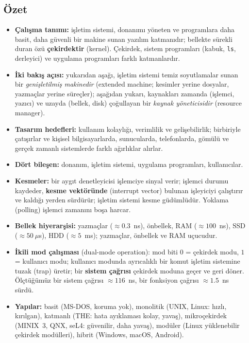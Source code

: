 \documentclass[11pt,a4paper]{article}
\newcommand{\term}[1]{\textbf{\color{mintdeep}#1}}
\newcommand{\cmd}[1]{\texttt{#1}}
\begin{document}
\subsection*{Özet}
\begin{itemize}
  \item \textbf{Çalışma tanımı:} işletim sistemi, donanımı yöneten ve programlara daha basit, daha güvenli bir makine sunan yazılım katmanıdır; bellekte sürekli duran özü \term{çekirdektir} (kernel). Çekirdek, sistem programları (kabuk, \cmd{ls}, derleyici) ve uygulama programları farklı katmanlardır.
  \item \textbf{İki bakış açısı:} yukarıdan aşağı, işletim sistemi temiz soyutlamalar sunan bir \emph{genişletilmiş makinedir} (extended machine; kesimler yerine dosyalar, yazmaçlar yerine süreçler); aşağıdan yukarı, kaynakları zamanda (işlemci, yazıcı) ve uzayda (bellek, disk) çoğullayan bir \emph{kaynak yöneticisidir} (resource manager).
  \item \textbf{Tasarım hedefleri:} kullanım kolaylığı, verimlilik ve gelişebilirlik; birbiriyle çatışırlar ve kişisel bilgisayarlarda, sunucularda, telefonlarda, gömülü ve gerçek zamanlı sistemlerde farklı ağırlıklar alırlar.
  \item \textbf{Dört bileşen:} donanım, işletim sistemi, uygulama programları, kullanıcılar.
  \item \textbf{Kesmeler:} bir aygıt denetleyicisi işlemciye sinyal verir; işlemci durumu kaydeder, \term{kesme vektöründe} (interrupt vector) bulunan işleyiciyi çalıştırır ve kaldığı yerden sürdürür; işletim sistemi kesme güdümlüdür. Yoklama (polling) işlemci zamanını boşa harcar.
  \item \textbf{Bellek hiyerarşisi:} yazmaçlar ($\approx 0.3$~ns), önbellek, RAM ($\approx 100$~ns), SSD ($\approx 50\ \mu$s), HDD ($\approx 5$~ms); yazmaçlar, önbellek ve RAM uçucudur.
  \item \textbf{İkili mod çalışması} (dual-mode operation): mod biti $0$ = çekirdek modu, $1$ = kullanıcı modu; kullanıcı modunda ayrıcalıklı bir komut işletim sistemine tuzak (trap) üretir; bir \term{sistem çağrısı} çekirdek moduna geçer ve geri döner. Ölçtüğümüz bir sistem çağrısı $\approx 116$~ns, bir fonksiyon çağrısı $\approx 1.5$~ns sürdü.
  \item \textbf{Yapılar:} basit (MS-DOS, koruma yok), monolitik (UNIX, Linux: hızlı, kırılgan), katmanlı (THE: hata ayıklaması kolay, yavaş), mikroçekirdek (MINIX~3, QNX, seL4: güvenilir, daha yavaş), modüler (Linux yüklenebilir çekirdek modülleri), hibrit (Windows, macOS, Android).
\end{itemize}
\end{document}
